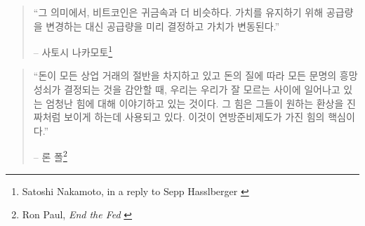 \begin{quotation}\begin{samepage}
		\enquote{그 의미에서, 비트코인은 귀금속과 더 비슷하다. 가치를 유지하기 위해 공급량을 변경하는 대신
			공급량을 미리 결정하고 가치가 변동된다.}
		\begin{flushright} -- 사토시 나카모토\footnote{Satoshi Nakamoto, in a reply to Sepp
				Hasslberger \cite{satoshi-precious-metal}}
\end{flushright}\end{samepage}\end{quotation}


\begin{comment}
	인간은 게으른 동물이기 때문에 당장 잘 작동하는 것에 대해 별로 걱정하지 않는다. 
	우리 대부분에게 돈은 잘 작동한다.
	자동차나 컴퓨터처럼 고장이 난 후에야 내부 작동 원리에 대해 생각할 수 밖에 없다. 
	나치의 잔혹한 행위로 친구와 가족이 사라지는 것을 본 사람들이 프라이버시의 가치를 아는 것처럼,
	초인플레이션으로 인해 인생을 바친 저축이 사라지는 것을 본 사람들은 경화(hard money)의 가치를 
	잘 알고 있다.
\end{comment}

\begin{comment}
	돈은 우리의 모든 생활에 영향을 끼친다는 것이 문제이다. 
	돈은 일상의 거래에 절반을 차지하고 있고, 
	돈을 만드는 일을 담당하는 사람들은 엄청난 힘을 가지고 있다.
\end{comment}

\begin{quotation}\begin{samepage}
		\enquote{돈이 모든 상업 거래의 절반을 차지하고 있고
			돈의 질에 따라 모든 문명의 흥망성쇠가 결정되는 것을 감안할 때,
			우리는 우리가 잘 모르는 사이에 일어나고 있는 엄청난 힘에 대해 이야기하고 있는 것이다.
			그 힘은 그들이 원하는 환상을 진짜처럼 보이게 하는데 사용되고 있다.
			이것이 연방준비제도가 가진 힘의 핵심이다.}
		\begin{flushright} -- 론 폴\footnote{Ron Paul, \textit{End the Fed} \cite{end-the-fed}}
\end{flushright}\end{samepage}\end{quotation}

